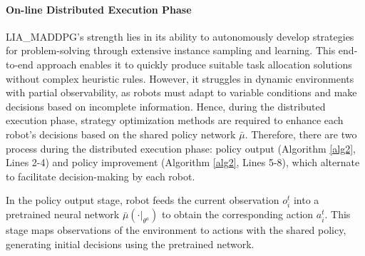 \documentclass[lettersize,journal]{IEEEtran}
\begin{document}
\paragraph{\textbf{On-line Distributed Execution Phase}}\label{subsection b.b}
LIA\_MADDPG's strength lies in its ability to autonomously develop strategies for problem-solving through extensive instance sampling and learning. This end-to-end approach enables it to quickly produce suitable task allocation solutions without complex heuristic rules. However, it struggles in dynamic environments with partial observability, as robots must adapt to variable conditions and make decisions based on incomplete information. Hence, during the distributed execution phase, strategy optimization methods are required to enhance each robot's decisions based on the shared policy network $\bar{\mu}$.
Therefore, there are two process during the distributed  execution phase: policy output (Algorithm \ref{alg2}, Lines 2-4) and policy improvement (Algorithm \ref{alg2}, Lines 5-8), which alternate to facilitate decision-making by each robot.

In the policy output stage, robot  feeds the current observation $o_i^t$   into a pretrained neural network $\bar{\mu}(\cdot|_{\theta^a})$  to obtain the corresponding action  $a_i^t$. This stage maps observations of the environment to actions with the shared policy, generating initial decisions using the pretrained network.
\end{document}
